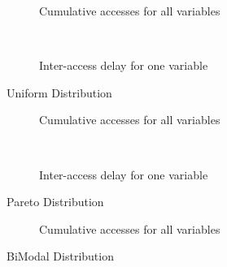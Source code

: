 \begin{figure}
        \centering
        \begin{subfigure}[b]{0.4\textwidth}
                \centering
                \caption{Cumulative accesses for all variables} \label{Uniform-cumul}
        \end{subfigure}
         ~~~ %
        \begin{subfigure}[b]{0.4\textwidth}
                \centering
                \caption{Inter-access delay for one variable} \label{Uniform-IAD}
        \end{subfigure}
        \caption{Uniform Distribution}
\end{figure}

\begin{figure}
        \centering
        \begin{subfigure}[b]{0.4\textwidth}
                \centering
                \caption{Cumulative accesses for all variables} \label{Pareto-cumul}
        \end{subfigure}
        ~~~ %
        \begin{subfigure}[b]{0.4\textwidth}
                \centering
                \caption{Inter-access delay for one variable} \label{Pareto-IAD}
        \end{subfigure}
        \caption{Pareto Distribution}
\end{figure}

\begin{figure}
        \centering
        \begin{subfigure}[b]{0.4\textwidth}
                \centering
                \caption{Cumulative accesses for all variables} \label{BiModal-cumul}
        \end{subfigure}
        \caption{BiModal Distribution}
\end{figure}

